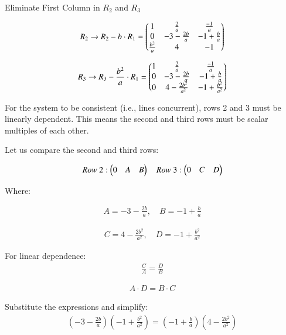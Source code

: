 \documentclass{beamer}
\begin{document}
\begin{frame}
Eliminate First Column in $R_2$ and $R_3$

\begin{align}
R_2 \rightarrow R_2 - b \cdot R_1 = 
\begin{pmatrix}
1 & \frac{2}{a} & \frac{-1}{a} \\
0 & -3 - \frac{2b}{a} & -1 + \frac{b}{a} \\
\frac{b^2}{a} & 4 & -1
\end{pmatrix}
\end{align}

\begin{align}
R_3 \rightarrow R_3 - \frac{b^2}{a} \cdot R_1 = 
\begin{pmatrix}
1 & \frac{2}{a} & \frac{-1}{a} \\
0 & -3 - \frac{2b}{a} & -1 + \frac{b}{a} \\
0 & 4 - \frac{2b^2}{a^2} & -1 + \frac{b^2}{a^2}
\end{pmatrix}
\end{align}
\end{frame}

\begin{frame}
For the system to be consistent (i.e., lines concurrent), rows 2 and 3 must be linearly dependent. This means the second and third rows must be scalar multiples of each other.

Let us compare the second and third rows:

\begin{align}
Row\ 2: \begin{pmatrix}0 \quad A \quad B\end{pmatrix} \quad
Row\ 3: \begin{pmatrix}0 \quad C \quad D\end{pmatrix}
\end{align}

Where:

\begin{align}
A = -3 - \frac{2b}{a}, \quad B = -1 + \frac{b}{a}
\end{align}

\begin{align}
C = 4 - \frac{2b^2}{a^2}, \quad D = -1 + \frac{b^2}{a^2}
\end{align}
\end{frame}

\begin{frame}
For linear dependence:
\begin{align}
\frac{C}{A} = \frac{D}{B}
\end{align}

\begin{align}
A \cdot D = B \cdot C
\end{align}

Substitute the expressions and simplify:
\begin{align}
\left(-3 - \frac{2b}{a}\right)\left(-1 + \frac{b^2}{a^2}\right) = 
\left(-1 + \frac{b}{a}\right)\left(4 - \frac{2b^2}{a^2}\right)
\end{align}
\end{frame}
\end{document}
